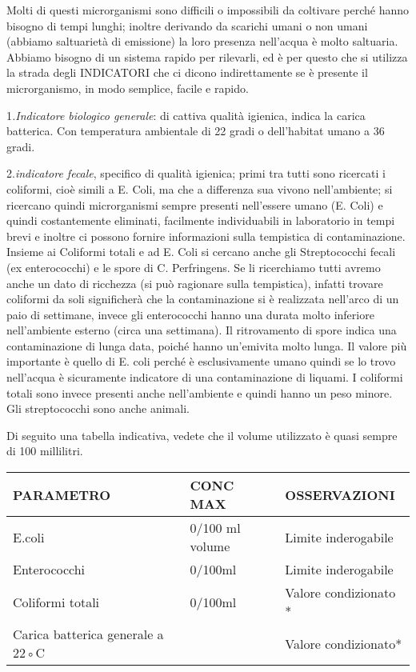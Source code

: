 \documentclass[]{article}
\begin{document}
Molti di questi microrganismi sono difficili o impossibili da coltivare
perché hanno bisogno di tempi lunghi; inoltre derivando da scarichi
umani o non umani (abbiamo saltuarietà di emissione) la loro presenza
nell'acqua è molto saltuaria. Abbiamo bisogno di un sistema rapido per
rilevarli, ed è per questo che si utilizza la strada degli INDICATORI
che ci dicono indirettamente se è presente il microrganismo, in modo
semplice, facile e rapido.

1\emph{.Indicatore biologico generale}: di cattiva qualità igienica,
indica la carica batterica. Con temperatura ambientale di 22 gradi o
dell'habitat umano a 36 gradi.

2.\emph{indicatore fecale}, specifico di qualità igienica; primi tra
tutti sono ricercati i coliformi, cioè simili a E. Coli, ma che a
differenza sua vivono nell'ambiente; si ricercano quindi microrganismi
sempre presenti nell'essere umano (E. Coli) e quindi costantemente
eliminati, facilmente individuabili in laboratorio in tempi brevi e
inoltre ci possono fornire informazioni sulla tempistica di
contaminazione. Insieme ai Coliformi totali e ad E. Coli si cercano
anche gli Streptococchi fecali (ex enterococchi) e le spore di C.
Perfringens. Se li ricerchiamo tutti avremo anche un dato di ricchezza
(si può ragionare sulla tempistica), infatti trovare coliformi da soli
significherà che la contaminazione si è realizzata nell'arco di un paio
di settimane, invece gli enterococchi hanno una durata molto inferiore
nell'ambiente esterno (circa una settimana). Il ritrovamento di spore
indica una contaminazione di lunga data, poiché hanno un'emivita molto
lunga. Il valore più importante è quello di E. coli perché è
esclusivamente umano quindi se lo trovo nell'acqua è sicuramente
indicatore di una contaminazione di liquami. I coliformi totali sono
invece presenti anche nell'ambiente e quindi hanno un peso minore. Gli
streptococchi sono anche animali.

Di seguito una tabella indicativa, vedete che il volume utilizzato è
quasi sempre di 100 millilitri.

\begin{longtable}[]{@{}lll@{}}
\toprule
PARAMETRO & CONC MAX & OSSERVAZIONI\tabularnewline
\midrule
\endhead
E.coli & 0/100 ml volume & Limite inderogabile\tabularnewline
Enterococchi & 0/100ml & Limite inderogabile\tabularnewline
Coliformi totali & 0/100ml & Valore condizionato *\tabularnewline
Carica batterica generale a 22◦C & & Valore condizionato*\tabularnewline
\bottomrule
\end{longtable}
\end{document}

